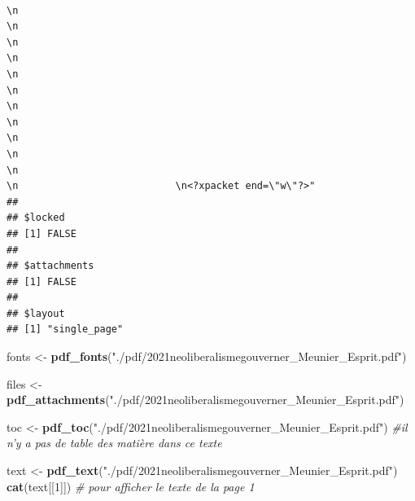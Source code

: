 \documentclass[
]{book}
\newenvironment{Shaded}{\begin{snugshade}}{\end{snugshade}}
\newcommand{\CommentTok}[1]{\textcolor[rgb]{0.56,0.35,0.01}{\textit{#1}}}
\newcommand{\DecValTok}[1]{\textcolor[rgb]{0.00,0.00,0.81}{#1}}
\newcommand{\KeywordTok}[1]{\textcolor[rgb]{0.13,0.29,0.53}{\textbf{#1}}}
\newcommand{\NormalTok}[1]{#1}
\newcommand{\StringTok}[1]{\textcolor[rgb]{0.31,0.60,0.02}{#1}}
\begin{document}
\begin{verbatim}
                                                                     \n                                                                                                    \n                                                                                                    \n                                                                                                    \n                                                                                                    \n                                                                                                    \n                                                                                                    \n                                                                                                    \n                                                                                                    \n                                                                                                    \n                                                                                                    \n                                                                                                    \n                           \n<?xpacket end=\"w\"?>"
## 
## $locked
## [1] FALSE
## 
## $attachments
## [1] FALSE
## 
## $layout
## [1] "single_page"
\end{verbatim}

\begin{Shaded}
\begin{Highlighting}[]
\NormalTok{fonts <-}\StringTok{ }\KeywordTok{pdf_fonts}\NormalTok{(}\StringTok{"./pdf/2021neoliberalismegouverner_Meunier_Esprit.pdf"}\NormalTok{)}

\NormalTok{files <-}\StringTok{ }\KeywordTok{pdf_attachments}\NormalTok{(}\StringTok{"./pdf/2021neoliberalismegouverner_Meunier_Esprit.pdf"}\NormalTok{)}

\NormalTok{toc <-}\StringTok{ }\KeywordTok{pdf_toc}\NormalTok{(}\StringTok{"./pdf/2021neoliberalismegouverner_Meunier_Esprit.pdf"}\NormalTok{) }\CommentTok{#il n'y a pas de table des matière dans ce texte}

\NormalTok{text <-}\StringTok{ }\KeywordTok{pdf_text}\NormalTok{(}\StringTok{"./pdf/2021neoliberalismegouverner_Meunier_Esprit.pdf"}\NormalTok{)}
\KeywordTok{cat}\NormalTok{(text[[}\DecValTok{1}\NormalTok{]]) }\CommentTok{# pour afficher le texte de la page 1}
\end{Highlighting}
\end{Shaded}
\end{document}
